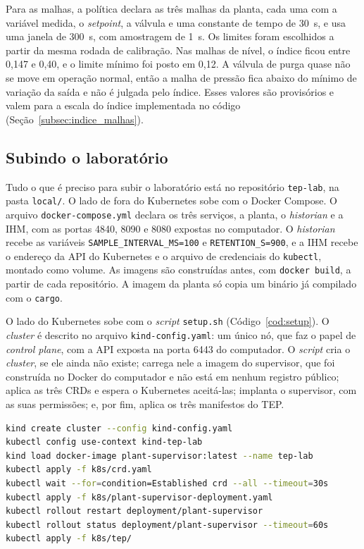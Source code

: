 Para as malhas, a política declara as três malhas da planta, cada uma com a variável medida, o \textit{setpoint}, a válvula e uma constante de tempo de 30~s, e usa uma janela de 300~s, com amostragem de 1~s. Os limites foram escolhidos a partir da mesma rodada de calibração. Nas malhas de nível, o índice ficou entre 0,147 e 0,40, e o limite mínimo foi posto em 0,12. A válvula de purga quase não se move em operação normal, então a malha de pressão fica abaixo do mínimo de variação da saída e não é julgada pelo índice. Esses valores são provisórios e valem para a escala do índice implementada no código (Seção~\ref{subsec:indice_malhas}).

\subsection{Subindo o laboratório}
\label{subsec:lab_kind}

Tudo o que é preciso para subir o laboratório está no repositório \texttt{tep-lab}, na pasta \texttt{local/}. O lado de fora do Kubernetes sobe com o Docker Compose. O arquivo \texttt{docker-compose.yml} declara os três serviços, a planta, o \textit{historian} e a IHM, com as portas 4840, 8090 e 8080 expostas no computador. O \textit{historian} recebe as variáveis \texttt{SAMPLE\_INTERVAL\_MS=100} e \texttt{RETENTION\_S=900}, e a IHM recebe o endereço da API do Kubernetes e o arquivo de credenciais do \texttt{kubectl}, montado como volume. As imagens são construídas antes, com \texttt{docker build}, a partir de cada repositório. A imagem da planta só copia um binário já compilado com o \texttt{cargo}.

O lado do Kubernetes sobe com o \textit{script} \texttt{setup.sh} (Código~\ref{cod:setup}). O \textit{cluster} é descrito no arquivo \texttt{kind-config.yaml}: um único nó, que faz o papel de \textit{control plane}, com a API exposta na porta 6443 do computador. O \textit{script} cria o \textit{cluster}, se ele ainda não existe; carrega nele a imagem do supervisor, que foi construída no Docker do computador e não está em nenhum registro público; aplica as três CRDs e espera o Kubernetes aceitá-las; implanta o supervisor, com as suas permissões; e, por fim, aplica os três manifestos do TEP.

\noindent\begin{minipage}{\linewidth}
\begin{lstlisting}[language=bash, caption={Os comandos do \textit{script} \texttt{setup.sh}}, label={cod:setup}]
kind create cluster --config kind-config.yaml
kubectl config use-context kind-tep-lab
kind load docker-image plant-supervisor:latest --name tep-lab
kubectl apply -f k8s/crd.yaml
kubectl wait --for=condition=Established crd --all --timeout=30s
kubectl apply -f k8s/plant-supervisor-deployment.yaml
kubectl rollout restart deployment/plant-supervisor
kubectl rollout status deployment/plant-supervisor --timeout=60s
kubectl apply -f k8s/tep/
\end{lstlisting}
\end{minipage}

